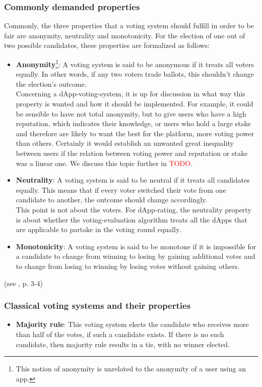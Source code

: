 \subsubsection{Commonly demanded properties}
Commonly, the three properties that a voting system should fulfill in order to be fair are anonymity, neutrality and monotonicity. For the election of one out of two possible candidates, these properties are formalized as follows:
\begin{itemize}
\item {\textbf{Anonymity}\footnote{This notion of anonymity is unrelated to the anonymity of a user using an app.}}:	A voting system is said to be anonymous if it treats all voters equally. In other words, if any two voters trade ballots, this shouldn't change the election's outcome. \\
Concerning a dApp-voting-system, it is up for discussion in what way this property is wanted and how it should be implemented. For example, it could be sensible to have not total anonymity, but to give users who have a high reputation, which indicates their knowledge, or users who hold a large stake and therefore are likely to want the best for the platform, more voting power than others. Certainly it would establish an unwanted great inequality between users if the relation between voting power and reputation or stake was a linear one. We discuss this topic further in \textcolor{red}{TODO}. %
\item {\textbf{Neutrality}}: A voting system is said to be neutral if it treats all candidates equally. This means that if every voter switched their vote from one candidate to another, the outcome should change accordingly. \\
This point is not about the voters. For dApp-rating, the neutrality property is about whether the voting-evaluation algorithm treats all the dApps that are applicable to partake in the voting round equally. 

\item {\textbf{Monotonicity}}: A voting system is said to be monotone if it is impossible for a candidate to change from winning to losing by gaining additional votes and to change from losing to winning by losing votes without gaining others. \\
\end{itemize} 
(see \cite{voting}, p. 3-4)

\subsubsection{Classical voting systems and their properties}
\begin{itemize}[leftmargin = 0pt]
\item {\textbf{Majority rule}}: This voting system elects the candidate who receives more than half of the votes, if such a candidate exists. If there is no such candidate, then majority rule results in a tie, with no winner elected.
\end{itemize}

